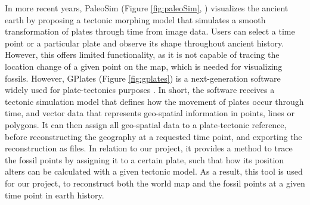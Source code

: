 \documentclass[11pt, a4paper,oneside,chapterprefix=false]{scrbook}
\begin{document}
In more recent years, PaleoSim (Figure \ref{fig:paleoSim}, \cite{rogge2010visualization}) visualizes the ancient earth by proposing a tectonic morphing model that simulates a smooth transformation of plates through time from image data. Users can select a time point or a particular plate and observe its shape throughout ancient history. However, this offers limited functionality, as it is not capable of tracing the location change of a given point on the map, which is needed for visualizing fossils. However, GPlates (Figure \ref{fig:gplates}) is a next-generation software widely used for plate-tectonics purposes \cite{boyden2011next} \cite{williams2012open} \cite{gurnis2012plate}. In short, the software receives a tectonic simulation model that defines how the movement of plates occur through time, and vector data that represents geo-spatial information in points, lines or polygons. It can then assign all geo-spatial data to a plate-tectonic reference, before reconstructing the geography at a requested time point, and exporting the reconstruction as files. In relation to our project, it provides a method to trace the fossil points by assigning it to a certain plate, such that how its position alters can be calculated with a given tectonic model. As a result, this tool is used for our project, to reconstruct both the world map and the fossil points at a given time point in earth history. \\
\end{document}
